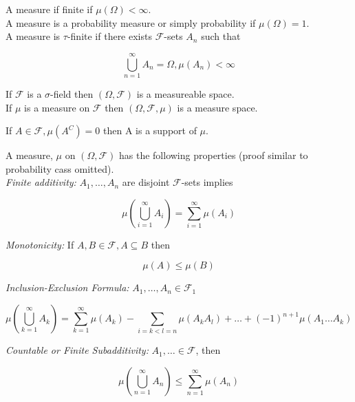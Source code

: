 \documentclass[11pt,fleqn]{book} %
\begin{document}
	A measure if finite if $\mu(\Omega) < \infty$.\\

	A measure is a probability measure or simply probability if  $\mu(\Omega)= 1$.\\

	A measure is $\tau$-finite if there exists $\mathcal{F}$-sets $A_n$ such that 

		$$\bigcup^\infty_{n=1} A_n = \Omega, \mu(A_n) < \infty $$

	If $\mathcal{F}$ is a $\sigma$-field then $(\Omega, \mathcal{F})$ is a measureable space. \\

	If $\mu$ is a measure on $\mathcal{F}$ then $(\Omega, \mathcal{F}, \mu)$ is a measure space.

	\begin{definition}[Support]
		If $A \in \mathcal{F}, \mu(A^C) = 0$ then A is a support of $\mu$.
	\end{definition}

	A measure, $\mu$ on $(\Omega, \mathcal{F})$ has the following properties (proof similar to probability cass omitted).\\

	\textit{Finite additivity:} $A_1, \dots, A_n$ are disjoint $\mathcal{F}$-sets implies

			$$\mu(\bigcup^\infty_{i=1} A_i) = \displaystyle \sum^\infty_{i=1} \mu(A_i)$$

	\textit{Monotonicity:} If $A, B \in \mathcal{F}, A \subseteq B$ then

			$$\mu(A) \leq \mu(B) $$

	\textit{Inclusion-Exclusion Formula:} $A_1, \dots, A_n \in \mathcal{F}_1$

		$$\mu(\bigcup^\infty_{k=1} A_k) = \displaystyle \sum^\infty_{k=1} \mu(A_k) - \displaystyle\sum_{i = k < l = n} \mu(A_k A_l) + \dots + (-1)^{n+1} \mu(A_1 \dots A_k) $$

	\textit{Countable or Finite Subadditivity:} $A_1, \dots \in \mathcal{F}$, then

		$$\mu(\bigcup^\infty_{n=1} A_n) \leq \displaystyle \sum^\infty_{n=1} \mu(A_n)  $$
\end{document}
